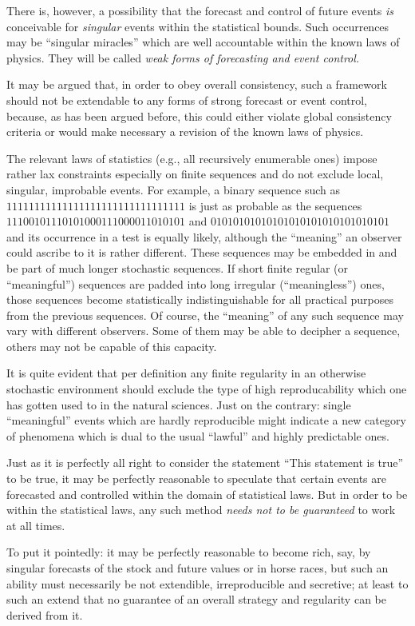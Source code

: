 There is, however, a possibility that the forecast and control of future
events {\em is} conceivable for {\em singular} events within the
statistical bounds. Such occurrences
may be ``singular miracles'' which are well accountable within
the known laws of physics. They will be called {\em weak forms of
forecasting and event control.}

It may be argued that, in order to obey overall
consistency, such a framework should not be extendable to any forms of strong forecast or
event control, because, as has been argued before, this could
either violate global consistency criteria
or would make necessary a revision of the known laws of physics.


The relevant laws of statistics (e.g., all recursively enumerable ones)
impose rather
lax constraints especially on finite sequences
and do not exclude local, singular, improbable events.
For example, a binary sequence such as
$11111111111111111111111111111111$
is just as probable as the sequences
$11100101110101000111000011010101$ and
$01010101010101010101010101010101$
and its occurrence in a test is equally likely, although  the
``meaning'' an observer could ascribe to it is rather different.
These sequences may be embedded in and be part of much longer stochastic
sequences. If short finite regular (or ``meaningful'') sequences are
padded into long irregular (``meaningless'') ones, those sequences
become statistically indistinguishable for all practical purposes
from the previous sequences.
Of course, the  ``meaning'' of any such sequence may vary with
different observers.
Some of them may be able to decipher a sequence, others may not be
capable of this capacity.

It is quite evident that per definition any
finite regularity in an otherwise stochastic environment should exclude
the type of high reproducability which one has gotten used to in the
natural sciences. Just on the contrary: single ``meaningful'' events
which are hardly reproducible might indicate  a new category of
phenomena which is dual to the usual ``lawful'' and highly predictable
ones.

Just as it is perfectly all right
to consider the statement ``This statement is true'' to be true, it may
be perfectly reasonable to speculate that certain events are
forecasted and controlled within the domain of statistical laws.
But in order to be  within the statistical laws, any such method
{\em needs not to be guaranteed} to work at all  times.


To put it pointedly: it may be perfectly reasonable to become rich,
say,
by singular forecasts of the stock and future values or in horse races, but
such an ability
must necessarily be not extendible, irreproducible and secretive; at
least to such an
extend that no guarantee of an overall strategy and regularity can be
derived from it.

